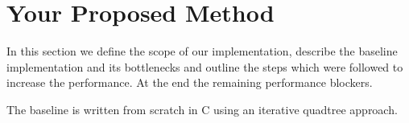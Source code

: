 \section{Your Proposed Method}\label{sec:yourmethod}






In this section we define the scope of our implementation, describe the baseline
implementation and its bottlenecks and outline the steps which were followed to
increase the performance. At the end the remaining performance blockers.

The baseline is written from scratch in C using an iterative quadtree approach.

